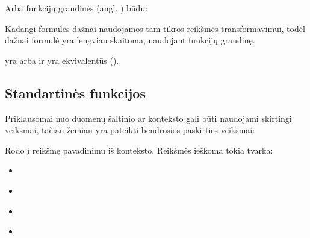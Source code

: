 \documentclass[letterpaper,10pt,lithuanian]{sphinxmanual}
\begin{document}
\sphinxAtStartPar
Arba funkcijų grandinės (angl. ) būdu:

\begin{sphinxVerbatim}[commandchars=\\\{\}]
\end{sphinxVerbatim}

\sphinxAtStartPar
Kadangi formulės dažnai naudojamos tam tikros reikšmės transformavimui, todėl
dažnai formulė yra lengviau skaitoma, naudojant funkcijų grandinę.

\sphinxAtStartPar
{} yra  arba  ir  yra ekvivalentūs
().


\subsection{Standartinės funkcijos}
\label{\detokenize{formules:standartines-funkcijos}}
\sphinxAtStartPar
Priklausomai nuo duomenų šaltinio ar konteksto gali būti naudojami skirtingi
veiksmai, tačiau žemiau yra pateikti bendrosios paskirties veiksmai:

\begin{fulllineitems}
\label{\detokenize{formules:bind}}
\pysigstartsignatures
\pysiglinewithargsret
{}
{}
{}
\pysigstopsignatures
\sphinxAtStartPar
Rodo į reikšmę pavadinimu  iš konteksto. Reikšmės ieškoma tokia
tvarka:
\begin{itemize}
\item {} 
\sphinxAtStartPar
{\hyperref[\detokenize{formules:var}]{}}

\item {} 
\sphinxAtStartPar
{\hyperref[\detokenize{formules:param}]{}}

\item {} 
\sphinxAtStartPar
{\hyperref[\detokenize{formules:item}]{}}

\item {} 
\sphinxAtStartPar
{\hyperref[\detokenize{formules:prop}]{}}

\end{itemize}

\end{fulllineitems}
\end{document}
